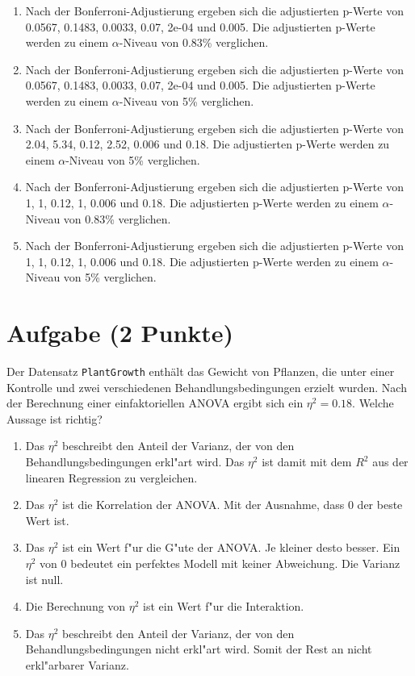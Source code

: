 \documentclass[a4paper, 10pt]{scrartcl}\usepackage[]{graphicx}\usepackage[]{xcolor}
\begin{document}
\begin{enumerate}
\item [\textbf{A} \msquare] Nach der Bonferroni-Adjustierung ergeben sich die adjustierten p-Werte von 0.0567, 0.1483, 0.0033, 0.07, 2e-04 und 0.005. Die adjustierten p-Werte werden zu einem $\alpha$-Niveau von 0.83\% verglichen.
\item [\textbf{B} \msquare] Nach der Bonferroni-Adjustierung ergeben sich die adjustierten p-Werte von 0.0567, 0.1483, 0.0033, 0.07, 2e-04 und 0.005. Die adjustierten p-Werte werden zu einem $\alpha$-Niveau von 5\% verglichen.
\item [\textbf{C} \msquare] Nach der Bonferroni-Adjustierung ergeben sich die adjustierten p-Werte von 2.04, 5.34, 0.12, 2.52, 0.006 und 0.18. Die adjustierten p-Werte werden zu einem $\alpha$-Niveau von 5\% verglichen.
\item [\textbf{D} \msquare] Nach der Bonferroni-Adjustierung ergeben sich die adjustierten p-Werte von 1, 1, 0.12, 1, 0.006 und 0.18. Die adjustierten p-Werte werden zu einem $\alpha$-Niveau von 0.83\% verglichen.
\item [\textbf{E} \msquare] Nach der Bonferroni-Adjustierung ergeben sich die adjustierten p-Werte von 1, 1, 0.12, 1, 0.006 und 0.18. Die adjustierten p-Werte werden zu einem $\alpha$-Niveau von 5\% verglichen.
\end{enumerate} 

\section{Aufgabe \hfill (2 Punkte)}



Der Datensatz \texttt{PlantGrowth} enth{\"a}lt das Gewicht von Pflanzen, die
unter einer Kontrolle und zwei verschiedenen Behandlungsbedingungen erzielt
wurden. Nach der Berechnung einer einfaktoriellen ANOVA ergibt sich ein
$\eta^2 = 0.18$. Welche Aussage ist richtig?



\begin{enumerate}
\item [\textbf{A} \msquare] Das $\eta^2$ beschreibt den Anteil der Varianz, der von den Behandlungsbedingungen erkl{"a}rt wird. Das $\eta^2$ ist damit mit dem $R^2$ aus der linearen Regression zu vergleichen.
\item [\textbf{B} \msquare] Das $\eta^2$ ist die Korrelation der ANOVA. Mit der Ausnahme, dass 0 der beste Wert ist.
\item [\textbf{C} \msquare] Das $\eta^2$ ist ein Wert f{"u}r die G{"u}te der ANOVA. Je kleiner desto besser. Ein $\eta^2$ von 0 bedeutet ein perfektes Modell mit keiner Abweichung. Die Varianz ist null.
\item [\textbf{D} \msquare] Die Berechnung von $\eta^2$ ist ein Wert f{"u}r die Interaktion.
\item [\textbf{E} \msquare] Das $\eta^2$ beschreibt den Anteil der Varianz, der von den Behandlungsbedingungen nicht erkl{"a}rt wird. Somit der Rest an nicht erkl{"a}rbarer Varianz.
\end{enumerate} 
\end{document}
